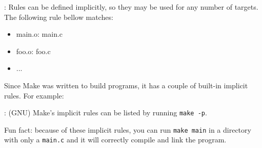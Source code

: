 

\begin{frame}{\secname: \small\subsecname\normalsize}
    Rules can be defined implicitly, so they may be used for any number of targets. The following rule bellow matches:

    \makeImplicit

    \begin{itemize}
        \item main.o: main.c
        \item foo.o: foo.c
        \item ...
    \end{itemize}

    Since Make was written to build programs, it has a couple of built-in implicit rules. For example:

    \makeImplicitCFile

\end{frame}

\begin{frame}{\secname: \small\subsecname\normalsize}
    (GNU) Make's implicit rules can be listed by running \texttt{make -p}.

    Fun fact: because of these implicit rules, you can run \texttt{make main} in a directory with only a \texttt{main.c} and it will correctly compile and link the program.

\end{frame}
